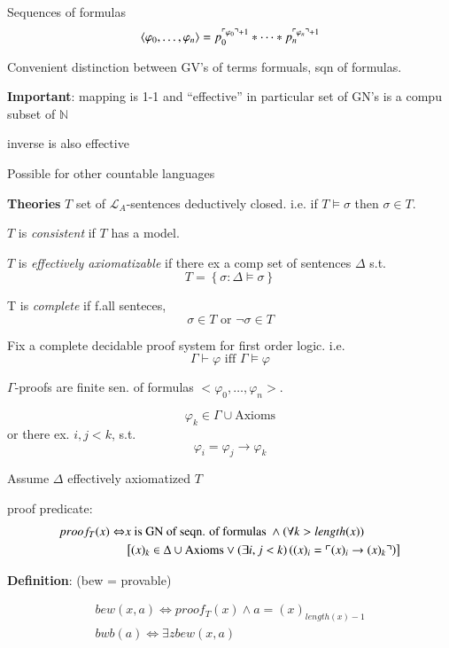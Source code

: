 \documentclass[12pt]{article}
\newcommand{\Nat}{\ensuremath{\mathbb{N}}}
\newcommand{\defn}{\textbf{Definition}: }
\begin{document}
Sequences of formulas
\[
 \langle \varphi_0, \dots, \varphi_n \rangle 
 = p_0^{\ulcorner \varphi_0 \urcorner + 1} * \dots * p_n^{\ulcorner \varphi_n \urcorner + 1}
\]

Convenient distinction between GV's of terms formuals, sqn of formulas.

\textbf{Important}: mapping is 1-1 and ``effective''
in particular set of GN's is a compu subset of $\Nat$

inverse is also effective

Possible for other countable languages


\textbf{Theories}
$T$ set of $\mathcal{L}_A$-sentences deductively closed.  
i.e. if $T \models \sigma$ then $\sigma \in T$.


$T$ is \emph{consistent} if $T$ has a model.

$T$ is \emph{effectively axiomatizable} if there ex a comp set of sentences 
$\Delta$ s.t.
\[
T = \left\{\sigma : \Delta \models \sigma \right\}
\]

T is \emph{complete} if f.all senteces,
\[
\sigma \in T \text{ or } \neg \sigma \in T
\]

Fix a complete decidable proof system for first order logic.
i.e.
\newcommand{\proves}{\vdash}
\[
\Gamma \proves \varphi \text{ iff } \Gamma \models \varphi
\]

$\Gamma$-proofs are finite sen. of formulas $<\varphi_0, \dots, \varphi_n >$.

\[
\varphi_k \in \Gamma \cup \text{Axioms}
\]
or there ex. $i,j < k$, s.t.
\[
\varphi_i = \varphi_j \rightarrow \varphi_k
\]

Assume $\Delta$ effectively axiomatized $T$

proof predicate:
\begin{align*}
  proof_T(x) \Leftrightarrow& x \text{ is GN of seqn. of formulas } 
  \wedge (\forall k > length(x) ) \\
  &\left[ (x)_k \in \Delta \cup \text{Axioms} \vee (\exists i,j < k) \left( (x)_i = \ulcorner (x)_i \rightarrow (x)_k \urcorner\right) \right]
\end{align*}

\defn
(bew = provable)

\begin{align*}
  bew(x,a) \Leftrightarrow proof_T(x) \wedge a =  (x)_{length(x)-1} \\
  bwb(a) \Leftrightarrow \exists z bew(x,a)
\end{align*}
\end{document}

